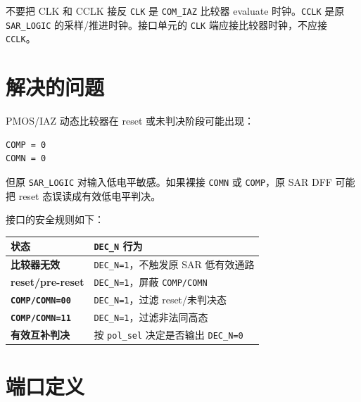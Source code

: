 \documentclass[11pt,a4paper,UTF8]{ctexart}
\begin{document}
\begin{warnbox}{不要把 CLK 和 CCLK 接反}
\texttt{CLK} 是 \texttt{COM\_IAZ} 比较器 evaluate 时钟。\texttt{CCLK} 是原 \texttt{SAR\_LOGIC} 的采样/推进时钟。接口单元的 \texttt{CLK} 端应接比较器时钟，不应接 \texttt{CCLK}。
\end{warnbox}

\section{解决的问题}

PMOS/IAZ 动态比较器在 reset 或未判决阶段可能出现：

\begin{lstlisting}[style=va,numbers=none]
COMP = 0
COMN = 0
\end{lstlisting}

但原 \texttt{SAR\_LOGIC} 对输入低电平敏感。如果裸接 \texttt{COMN} 或 \texttt{COMP}，原 SAR DFF 可能把 reset 态误读成有效低电平判决。

接口的安全规则如下：

\begin{center}
\begin{tabularx}{0.92\textwidth}{>{\bfseries}lX}
\toprule
状态 & \texttt{DEC\_N} 行为 \\
\midrule
比较器无效 & \texttt{DEC\_N=1}，不触发原 SAR 低有效通路 \\
reset/pre-reset & \texttt{DEC\_N=1}，屏蔽 \texttt{COMP/COMN} \\
\texttt{COMP/COMN=00} & \texttt{DEC\_N=1}，过滤 reset/未判决态 \\
\texttt{COMP/COMN=11} & \texttt{DEC\_N=1}，过滤非法同高态 \\
有效互补判决 & 按 \texttt{pol\_sel} 决定是否输出 \texttt{DEC\_N=0} \\
\bottomrule
\end{tabularx}
\end{center}

\section{端口定义}
\end{document}
